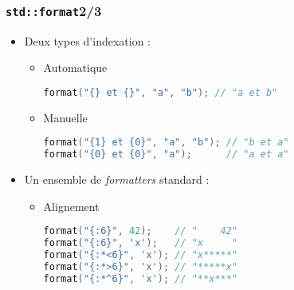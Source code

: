 \documentclass[C++.tex]{subfiles}
\begin{document}
\begin{frame}[fragile]
	\frametitle{\lstinline|std::format|\titlehfill{}2/3}
	\begin{itemize}
		\item Deux types d'indexation :
		\begin{itemize}
			\item Automatique
	
			\begin{lstlisting}[language=C++]
format("{} et {}", "a", "b"); // "a et b"\end{lstlisting}
	
			\item Manuelle
	
			\begin{lstlisting}[language=C++]
format("{1} et {0}", "a", "b"); // "b et a"
format("{0} et {0}", "a");      // "a et a"\end{lstlisting}
	
		\end{itemize}


		\item Un ensemble de \textit{formatters} standard :
		\begin{itemize}
			\item Alignement

			\begin{lstlisting}[language=C++]
format("{:6}", 42);    // "    42"
format("{:6}", 'x');   // "x     "
format("{:*<6}", 'x'); // "x*****"
format("{:*>6}", 'x'); // "*****x"
format("{:*^6}", 'x'); // "**x***"\end{lstlisting}

		\end{itemize}
	\end{itemize}
\end{frame}
\end{document}
